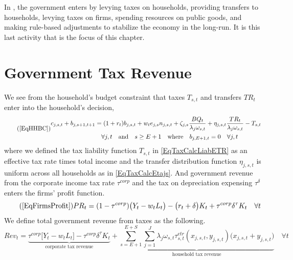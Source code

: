 
In \ogindia, the government enters by levying taxes on households, providing transfers to households, levying taxes on firms, spending resources on public goods, and making rule-based adjustments to stabilize the economy in the long-run. It is this last activity that is the focus of this chapter.


\section{Government Tax Revenue}\label{SecUnbalGBCrev}

  We see from the household's budget constraint that taxes $T_{s,t}$ and transfers $TR_{t}$ enter into the household's decision,
  \begin{equation}\tag{\ref{EqHHBC}}
    \begin{split}
      c_{j,s,t} + b_{j,s+1,t+1} &= (1 + r_{t})b_{j,s,t} + w_t e_{j,s} n_{j,s,t} + \zeta_{j,s}\frac{BQ_t}{\lambda_j\omega_{s,t}} + \eta_{j,s,t}\frac{TR_{t}}{\lambda_j\omega_{s,t}} - T_{s,t}  \\
      &\quad\forall j,t\quad\text{and}\quad s\geq E+1 \quad\text{where}\quad b_{j,E+1,t}=0\quad\forall j,t
    \end{split}
  \end{equation}
  where we defined the tax liability function $T_{s,t}$ in \eqref{EqTaxCalcLiabETR} as an effective tax rate times total income and the transfer distribution function $\eta_{j,s,t}$ is uniform across all households as in \eqref{EqTaxCalcEtajs}. And government revenue from the corporate income tax rate $\tau^{corp}$ and the tax on depreciation expensing $\tau^\delta$ enters the firms' profit function.
  \begin{equation}\tag{\ref{EqFirmsProfit}}
    PR_t = (1 - \tau^{corp})\bigl(Y_t - w_t L_t\bigr) - \bigl(r_t + \delta\bigr)K_t + \tau^{corp}\delta^\tau K_t \quad\forall t
  \end{equation}
  We define total government revenue from taxes as the following.
  \begin{equation}\label{EqUnbalGBCgovRev}
    Rev_t = \underbrace{\tau^{corp}\bigl[Y_t - w_t L_t\bigr] - \tau^{corp}\delta^\tau K_t}_{\text{corporate tax revenue}} + \underbrace{\sum_{s=E+1}^{E+S}\sum_{j=1}^J\lambda_j\omega_{s,t}\tau^{etr}_{s,t}\left(x_{j,s,t},y_{j,s,t}\right)\bigl(x_{j,s,t} + y_{j,s,t}\bigr)}_{\text{household tax revenue}} \quad\forall t
  \end{equation}


